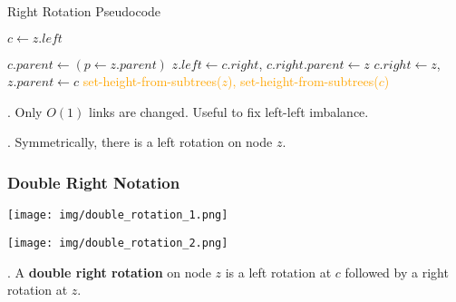 \documentclass{article}
\begin{document}
\begin{algorithm}[H]
    \DontPrintSemicolon  %
    \SetAlgoLined        %
    \caption{Right Rotation Pseudocode}

    \BlankLine
    
    $c \leftarrow z.left$

    $c.parent \leftarrow (p \leftarrow z.parent)$ \;
     
    $z.left \leftarrow c.right$, $c.right.parent \leftarrow z$ \; 
    $c.right \leftarrow z$, $z.parent \leftarrow c$ \; 
    \textcolor{orange}{set-height-from-subtrees($z$), set-height-from-subtrees($c$)} \;
      
\end{algorithm}

\begin{discovery}[].
    Only $O(1)$ links are changed. Useful to fix left-left imbalance.
\end{discovery}

\begin{result}[].
    Symmetrically, there is a left rotation on node $z$. 
\end{result}

\subsubsection{Double Right Notation} 

\begin{minipage}{0.6\textwidth}
    \begin{center}
        \texttt{[image: img/double\_rotation\_1.png]}
    \end{center}
\end{minipage}\begin{minipage}{0.4\textwidth}
    \begin{center}
        \texttt{[image: img/double\_rotation\_2.png]}
    \end{center}
\end{minipage}

\begin{deff}.
    A \textbf{double right rotation} on node $z$ is a left rotation at $c$ followed by a right rotation at $z$.
\end{deff}
\end{document}
